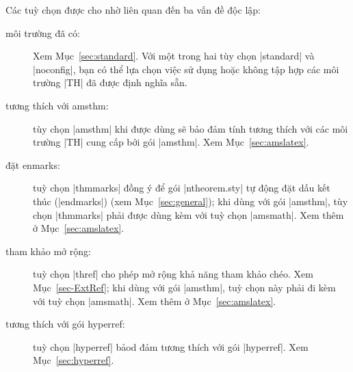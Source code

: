 \documentclass[11pt,oneside]{ltxdoc}
\theoremstyle{marginbreak}
\theoremstyle{changebreak}
\theoremstyle{change}
\theoremstyle{plain}
\theoremstyle{nonumberplain}
\begin{document}
\medskip
Các tuỳ chọn được cho nhờ  liên quan đến ba vấn đề độc lập:
\begin{description}
\item[môi trường đã có:] Xem Mục~\vref{sec:standard}. Với một
	trong hai tùy chọn |standard| và |noconfig|,
	bạn có thể lựa chọn việc sử dụng hoặc không tập hợp
	các môi trường |TH| đã được định nghĩa sẵn.
\item[tương thích với amsthm:]
	tùy chọn |amsthm| khi được dùng sẽ bảo đảm tính tương thích với các môi trường
	|TH| cung cấp bởi gói |amsthm|. Xem Mục~\vref{sec:amslatex}.
\item[đặt enmarks:]
	tuỳ chọn |thmmarks| đồng ý để gói |ntheorem.sty| tự động đặt dấu kết thúc
	(|endmarks|) (xem Mục~\ref{sec:general}); khi dùng với gói |amsthm|,
	tùy chọn |thmmarks| phải được dùng kèm với tuỳ chọn |amsmath|.
	Xem thêm ở Mục~\ref{sec:amslatex}.
\item[tham khảo mở rộng:]
	tuỳ chọn |thref| cho phép mở rộng khả năng tham khảo chéo. Xem Mục~\vref{sec-ExtRef};
	khi dùng với gói |amsthm|, tuỳ chọn này phải đi kèm với tuỳ chọn |amsmath|.
	Xem thêm ở Mục~\ref{sec:amslatex}.
\item[tương thích với gói hyperref:]
	tuỳ chọn |hyperref| bảod đảm tương thích với gói |hyperref|.
	Xem Mục~\vref{sec:hyperref}.
\end{description}
\end{document}
